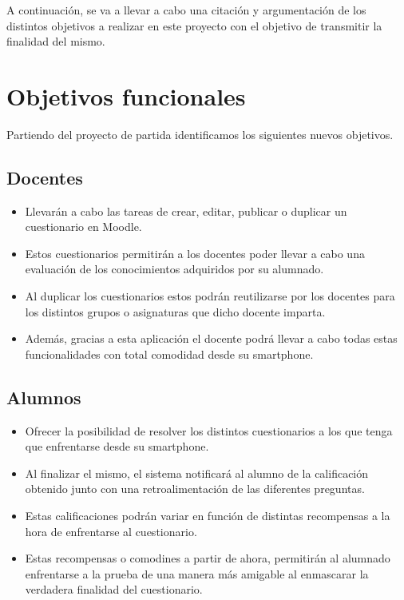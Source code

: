 
A continuación, se va a llevar a cabo una citación y argumentación de los distintos objetivos a realizar en este proyecto con el objetivo de transmitir la finalidad del mismo.

\section{Objetivos funcionales}

Partiendo del proyecto de partida identificamos los siguientes nuevos objetivos.

\subsection{Docentes}

\begin{itemize}

	\item Llevarán a cabo las tareas de crear, editar, publicar o duplicar un cuestionario en Moodle.
	\item Estos cuestionarios permitirán a los docentes poder llevar a cabo una evaluación de los conocimientos adquiridos por su alumnado.
	\item Al duplicar los cuestionarios estos podrán reutilizarse por los docentes para los distintos grupos o asignaturas que dicho docente imparta.
	\item Además, gracias a esta aplicación el docente podrá llevar a cabo todas estas funcionalidades con total comodidad desde su smartphone.
	
\end{itemize}

\subsection{Alumnos}

\begin{itemize}

	\item Ofrecer la posibilidad de resolver los distintos cuestionarios a los que tenga que enfrentarse desde su smartphone.
	\item Al finalizar el mismo, el sistema notificará al alumno de la calificación obtenido junto con una retroalimentación de las diferentes preguntas.
	\item Estas calificaciones podrán variar en función de distintas recompensas a la hora de enfrentarse al cuestionario.
	\item Estas recompensas o comodines a partir de ahora, permitirán al alumnado enfrentarse a la prueba de una manera más amigable al enmascarar la verdadera finalidad del cuestionario.

\end{itemize}

